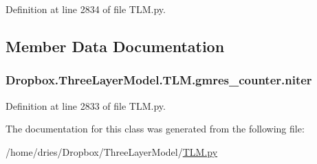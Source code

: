 Definition at line 2834 of file T\+L\+M.\+py.



\subsection{Member Data Documentation}
\hypertarget{classDropbox_1_1ThreeLayerModel_1_1TLM_1_1gmres__counter_a06345986c3808b531029b01953ec92a5}{
\subsubsection[{niter}]{\setlength{\rightskip}{0pt plus 5cm}Dropbox.\+Three\+Layer\+Model.\+T\+L\+M.\+gmres\+\_\+counter.\+niter}}\label{classDropbox_1_1ThreeLayerModel_1_1TLM_1_1gmres__counter_a06345986c3808b531029b01953ec92a5}


Definition at line 2833 of file T\+L\+M.\+py.



The documentation for this class was generated from the following file\+:\begin{DoxyCompactItemize}
\item 
/home/dries/\+Dropbox/\+Three\+Layer\+Model/\hyperlink{TLM_8py}{T\+L\+M.\+py}\end{DoxyCompactItemize}
